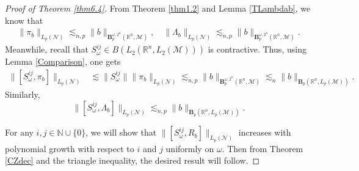 \documentclass[oneside,english,a4wide]{amsart}
\numberwithin{equation}{section}
\numberwithin{figure}{section}
\theoremstyle{plain}
\theoremstyle{plain}
\theoremstyle{definition}
\theoremstyle{plain}
\theoremstyle{remark}
\theoremstyle{definition}
\theoremstyle{remark}
\theoremstyle{definition}
\newcommand{\8}{\infty}
\begin{document}
\begin{proof}[Proof of Theorem \ref{thm6.4}]
	From Theorem \ref{thm1.2} and Lemma \ref{TLambdab}, we know that
	\begin{equation*}
		\begin{aligned}
			\|\pi_b\|_{L_p(\mathcal{N})}\lesssim_{n, p}\|b\|_{\pmb{B}_p^{\omega, 2^n}(\mathbb{R}^n,\mathcal{M})},\quad \|\varLambda_b\|_{L_p(\mathcal{N})}\lesssim_{n, p}\|b\|_{\pmb{B}_p^{\omega, 2^n}(\mathbb{R}^n,\mathcal{M})}.
		\end{aligned}
	\end{equation*}
	Meanwhile, recall that $S_\omega^{ij}\in B(L_2(\mathbb{R}^n,L_2(\mathcal{M})))$ is contractive. Thus, using Lemma \ref{Comparison}, one gets
	\begin{equation*}
		\begin{aligned}
			\|[S_\omega^{ij},\pi_b]\|_{L_p(\mathcal{N})}&\lesssim \|S_\omega^{ij}\|\|\pi_b\|_{L_p(\mathcal{N})}
			\lesssim_{n,p} \|b\|_{\pmb{B}_p^{\omega, 2^n}(\mathbb{R}^n,\mathcal{M})}\lesssim_{n} \|b\|_{\pmb{B}_p(\mathbb{R}^n,L_p(\mathcal{M}))}.
		\end{aligned}
	\end{equation*}
	Similarly,
	$$ \|[S_\omega^{ij},\varLambda_b]\|_{L_p(\mathcal{N})}\lesssim_{n,p} \|b\|_{\pmb{B}_p(\mathbb{R}^n,L_p(\mathcal{M}))}.$$
	
	For any $i, j\in \mathbb{N}\cup\{0\}$, we will show that $\|[S^{ij}_\omega,R_b]\|_{L_p(\mathcal{N})}$ increases with polynomial growth with respect to $i$ and $j$ uniformly on $\omega$. Then from Theorem \ref{CZdec} and the triangle inequality, the desired result will follow.
	

\end{proof}
\end{document}

